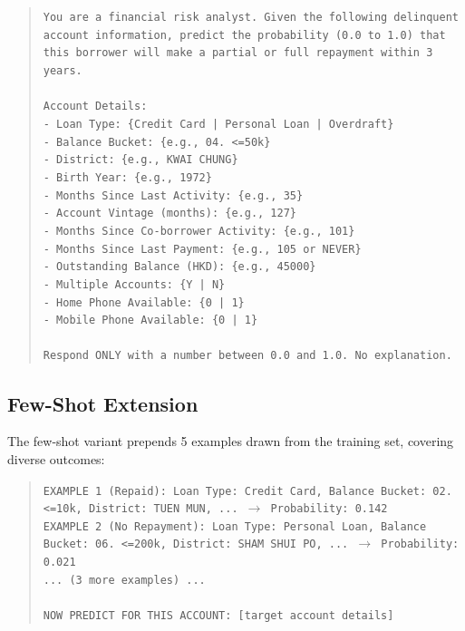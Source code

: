 \documentclass[12pt, a4paper]{article}
\begin{document}
\begin{quote}
\small
\texttt{You are a financial risk analyst. Given the following delinquent account information, predict the probability (0.0 to 1.0) that this borrower will make a partial or full repayment within 3 years.}\\
\texttt{ }\\
\texttt{Account Details:}\\
\texttt{- Loan Type: \{Credit Card | Personal Loan | Overdraft\}}\\
\texttt{- Balance Bucket: \{e.g., 04. <=50k\}}\\
\texttt{- District: \{e.g., KWAI CHUNG\}}\\
\texttt{- Birth Year: \{e.g., 1972\}}\\
\texttt{- Months Since Last Activity: \{e.g., 35\}}\\
\texttt{- Account Vintage (months): \{e.g., 127\}}\\
\texttt{- Months Since Co-borrower Activity: \{e.g., 101\}}\\
\texttt{- Months Since Last Payment: \{e.g., 105 or NEVER\}}\\
\texttt{- Outstanding Balance (HKD): \{e.g., 45000\}}\\
\texttt{- Multiple Accounts: \{Y | N\}}\\
\texttt{- Home Phone Available: \{0 | 1\}}\\
\texttt{- Mobile Phone Available: \{0 | 1\}}\\
\texttt{ }\\
\texttt{Respond ONLY with a number between 0.0 and 1.0. No explanation.}
\end{quote}

\subsection{Few-Shot Extension}

The few-shot variant prepends 5 examples drawn from the training set, covering diverse outcomes:

\begin{quote}
\small
\texttt{EXAMPLE 1 (Repaid): Loan Type: Credit Card, Balance Bucket: 02. <=10k, District: TUEN MUN, ... $\rightarrow$ Probability: 0.142}\\
\texttt{EXAMPLE 2 (No Repayment): Loan Type: Personal Loan, Balance Bucket: 06. <=200k, District: SHAM SHUI PO, ... $\rightarrow$ Probability: 0.021}\\
\texttt{... (3 more examples) ...}\\
\texttt{ }\\
\texttt{NOW PREDICT FOR THIS ACCOUNT: [target account details]}
\end{quote}
\end{document}
